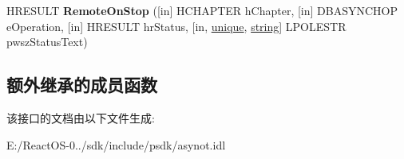 \begin{DoxyCompactItemize}
\item 
\mbox{\label{interface_i_d_b_asynch_notify_a916ea25edfd5cabe43a762adc28de79c}} 
H\+R\+E\+S\+U\+LT {\bfseries Remote\+On\+Stop} (\mbox{[}in\mbox{]} H\+C\+H\+A\+P\+T\+ER h\+Chapter, \mbox{[}in\mbox{]} D\+B\+A\+S\+Y\+N\+C\+H\+OP e\+Operation, \mbox{[}in\mbox{]} H\+R\+E\+S\+U\+LT hr\+Status, \mbox{[}in, \hyperlink{interfaceunique}{unique}, \hyperlink{structstring}{string}\mbox{]} L\+P\+O\+L\+E\+S\+TR pwsz\+Status\+Text)
\end{DoxyCompactItemize}
\subsection*{额外继承的成员函数}


该接口的文档由以下文件生成\+:\begin{DoxyCompactItemize}
\item 
E\+:/\+React\+O\+S-\/0../sdk/include/psdk/asynot.\+idl\end{DoxyCompactItemize}
